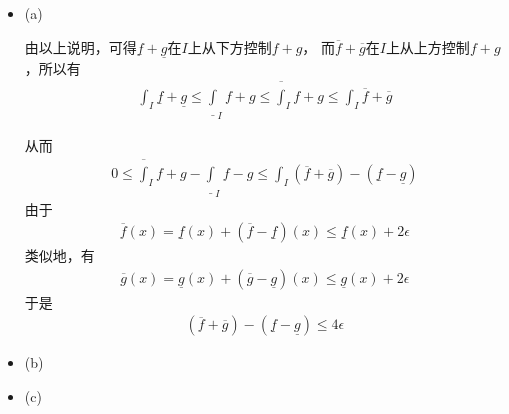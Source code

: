 \documentclass{article}
\begin{document}
\begin{itemize}
  \item (a)

        由以上说明，可得$\underline{f} + \underline{g}$在$I$上从下方控制$f + g$，
        而$\overline{f} + \overline{g}$在$I$上从上方控制$f + g$，所以有
        \begin{align*}
          \int_{I} \underline{f} + \underline{g} \leq \underline{\int}_I f + g \leq \overline{\int}_I f + g \leq \int_I \overline{f} + \overline{g} 
        \end{align*}

        从而
        \begin{align*}
          0 \leq \overline{\int}_I f + g - \underline{\int}_I f - g \leq \int_I (\overline{f} + \overline{g}) -  (\underline{f} - \underline{g})
        \end{align*}
        由于
        \begin{align*}
          \overline{f}(x) = \underline{f}(x) + (\overline{f} - \underline{f})(x) \leq \underline{f}(x) + 2\epsilon
        \end{align*}
        类似地，有
        \begin{align*}
          \overline{g}(x) = \underline{g}(x) + (\overline{g} - \underline{g})(x) \leq \underline{g}(x) + 2\epsilon
        \end{align*}
        于是 
        \begin{align*}
          (\overline{f} + \overline{g}) -  (\underline{f} - \underline{g}) \leq 4\epsilon
        \end{align*}



  \item (b)
  \item (c)
\end{itemize}
\end{document}
